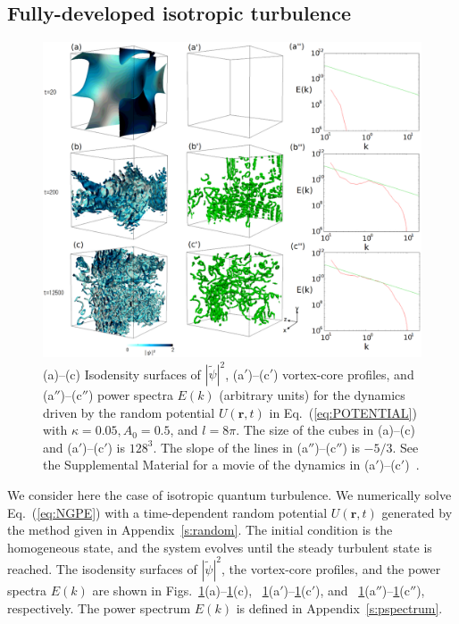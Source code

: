 \documentclass[aps,onecolumn,pra,longbibliography]{revtex4}
\begin{document}
	\subsection{Fully-developed isotropic turbulence}
	\label{s:distributions}
	\begin{figure}[t]
		\centering
		\includegraphics[width=17cm]{FIG4.eps}
		\caption{
			(a)--(c) Isodensity surfaces of $|\tilde{\psi}|^2$,
			(a$'$)--(c$'$) vortex-core profiles,
			and (a$''$)--(c$''$) power spectra $E(k)$ (arbitrary units) for the dynamics driven by
			the random potential $U(\bm{r}, t)$ in Eq.~(\ref{eq:POTENTIAL}) with
			$\kappa=0.05, A_0=0.5$, and $l=8\pi $.
			The size of the cubes in (a)--(c) and (a$'$)--(c$'$) is  $128^3$.
			The slope of the lines in (a$''$)--(c$''$) is $-5/3$.
			See the Supplemental Material for a movie of the dynamics
			in (a$'$)--(c$'$)~\cite{SM}.
		}
		\label{f:TURB}
	\end{figure}
	We consider here the case of isotropic quantum turbulence.
	We numerically solve Eq.~(\ref{eq:NGPE})
	with a time-dependent random potential $U(\bm{r},t)$ generated by
	the method given in Appendix~\ref{s:random}.
	The initial condition is the homogeneous state,
	and the system evolves until the steady turbulent state is reached.
	The isodensity surfaces of $|\tilde\psi|^2$,
	the vortex-core profiles,
	and the power spectra $E(k)$ are shown
	in Figs.~\ref{f:TURB}(a)--\ref{f:TURB}(c), ~\ref{f:TURB}(a$'$)--\ref{f:TURB}(c$'$),
	and ~\ref{f:TURB}(a$''$)--\ref{f:TURB}(c$''$), respectively.
	The power spectrum $E(k)$ is defined in Appendix~\ref{s:pspectrum}.
\end{document}

